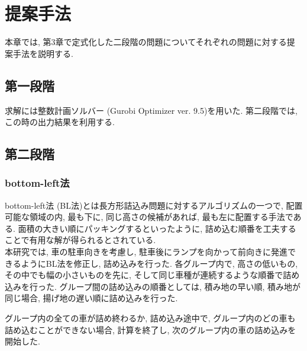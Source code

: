 \chapter{提案手法}\label{method}
本章では, 第3章で定式化した二段階の問題についてそれぞれの問題に対する提案手法を説明する. 

\section{第一段階}
求解には整数計画ソルバー (Gurobi Optimizer ver. 9.5)を用いた. 
第二段階では, この時の出力結果を利用する.  

\section{第二段階}
\subsection*{bottom-left法}
bottom-left法 (BL法)とは長方形詰込み問題に対するアルゴリズムの一つで, 配置可能な領域の内, 最も下に, 同じ高さの候補があれば, 最も左に配置する手法である\cite{nfp2}. 
面積の大きい順にパッキングするといったように, 詰め込む順番を工夫することで有用な解が得られるとされている. \\


本研究では, 車の駐車向きを考慮し, 駐車後にランプを向かって前向きに発進できるようにBL法を修正し, 詰め込みを行った. 
各グループ内で, 高さの低いもの, その中でも幅の小さいものを先に, そして同じ車種が連続するような順番で詰め込みを行った. 
グループ間の詰め込みの順番としては, 積み地の早い順, 積み地が同じ場合, 揚げ地の遅い順に詰め込みを行った. 

グループ内の全ての車が詰め終わるか, 詰め込み途中で, グループ内のどの車も詰め込むことができない場合, 計算を終了し, 次のグループ内の車の詰め込みを開始した. 
